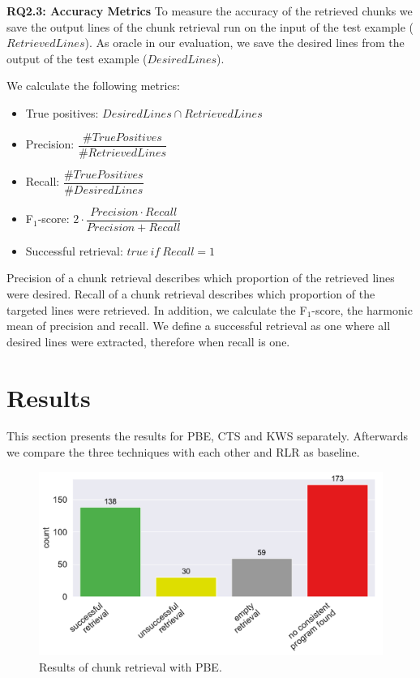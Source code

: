 \noindent
\textbf{RQ2.3: Accuracy Metrics}
To measure the accuracy of the retrieved chunks we save the output lines of the chunk retrieval run on the input of the test example ($\mathit{RetrievedLines}$).
As oracle in our evaluation, we save the desired lines from the output of the test example ($\mathit{DesiredLines}$).

We calculate the following metrics:
\begin{itemize}
	 \itemsep0.75em
	\item True positives: $\mathit{DesiredLines} \cap \mathit{RetrievedLines}$
	\item Precision: $\dfrac{\# \mathit{TruePositives}}{\# \mathit{RetrievedLines}}$
	\item Recall: $\dfrac{\# \mathit{TruePositives}}{\# \mathit{DesiredLines}}$
	\item F$_{1}$-score: $2 \cdot \dfrac{\mathit{Precision} \cdot \mathit{Recall}}{\mathit{Precision} + \mathit{Recall}}$
	\item Successful retrieval: $\mathit{true}\ \mathit{if}\ \mathit{Recall} = 1$
\end{itemize}

Precision of a chunk retrieval describes which proportion of the retrieved lines were desired.
Recall of a chunk retrieval describes which proportion of the targeted lines were retrieved.
In addition, we calculate the F$_{1}$-score, the harmonic mean of precision and recall.
We define a successful retrieval as one where all desired lines were extracted, therefore when recall is one.



\section{Results}
This section presents the results for PBE, CTS and KWS separately.
Afterwards we compare the three techniques with each other and RLR as baseline.

\begin{figure}[!t]
		\centering
		\includegraphics[width=0.75\columnwidth, clip]{img/big-study/failure-reason-pbe.pdf}
		\caption{Results of chunk retrieval with PBE.}
		\label{fig:failure-reason-PBE}
\end{figure}

